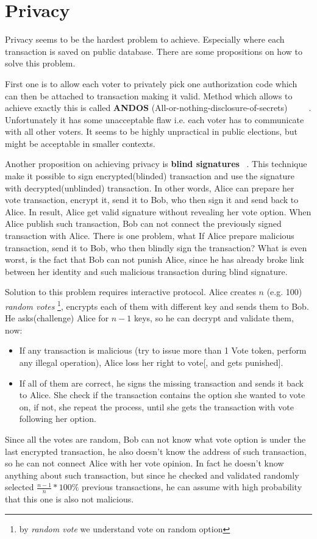 \documentclass[runningheads]{llncs}
\begin{document}
\section{Privacy} %
Privacy seems to be the hardest problem to achieve. Especially where each transaction is saved on public database. There are some propositions on how to solve this problem. 

First one is to allow each voter to privately pick one authorization code which can then be attached to transaction making it valid. Method which allows to achieve exactly this is called \textbf{ANDOS} (All-or-nothing-disclosure-of-secrets) ~\cite{andos} ~\cite{salomaa1990secret} ~\cite{applied_cryptography}. Unfortunately it has some unacceptable flaw i.e. each voter has to communicate with all other voters. It seems to be highly unpractical in public elections, but might be acceptable in smaller contexts. 

Another proposition on achieving privacy is \textbf{blind signatures} ~\cite{applied_cryptography}. This technique make it possible to sign encrypted(blinded) transaction and use the signature with decrypted(unblinded) transaction. In other words, Alice can prepare her vote transaction, encrypt it, send it to Bob, who then sign it and send back to Alice. In result, Alice get valid signature without revealing her vote option. When Alice publish such transaction, Bob can not connect the previously signed transaction with Alice. 
There is one problem, what If Alice prepare malicious transaction, send it to Bob, who then blindly sign the transaction? What is even worst, is the fact that Bob can not punish Alice, since he has already broke link between her identity and such malicious transaction during blind signature.

Solution to this problem requires interactive protocol.
Alice creates \(n\) (e.g. 100) \textit{random votes} \footnote{by \textit{random vote} we understand vote on random option}, encrypts each of them with different key and sends them to Bob. He asks(challenge) Alice for \(n-1\) keys, so he can decrypt and validate them, now: 
\begin{itemize}
 \item If any transaction is malicious (try to issue more than 1 Vote token, perform any illegal operation), Alice loss her right to vote[, and gets punished].

 \item If all of them are correct, he signs the missing transaction and sends it back to Alice. She check if the transaction contains the option she wanted to vote on, if not, she repeat the process, until she gets the transaction with vote following her option.
\end{itemize}
Since all the votes are random, Bob can not know what vote option is under the last encrypted transaction, he also doesn't know the address of such transaction, so he can not connect Alice with her vote opinion. In fact he doesn't know anything about such transaction, but since he checked and validated randomly selected \(\frac{n-1}{n}*100\%\) previous transactions, he can assume with high probability that this one is also not malicious.
\end{document}
